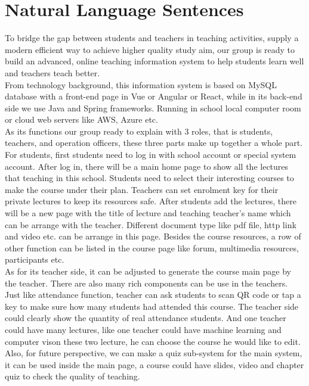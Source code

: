 \section{Natural Language Sentences}

To bridge the gap between students and teachers in teaching activities, supply a modern efficient way to achieve higher quality study aim, our group is ready to build an advanced, online teaching information system to help students learn well and teachers teach better.\\


From technology background, this information system is based on MySQL database with a front-end page in Vue or Angular or React, while in its back-end side we use Java and Spring frameworks. Running in school local computer room or cloud web servers like AWS, Azure etc.\\


As its functions our group ready to explain with 3 roles, that is students, teachers, and operation officers, these three parts make up together a whole part.\\


For students, first students need to log in with school account or special system account. After log in, there will be a main home page to show all the lectures that teaching in this school. Students need to select their interesting courses to make the course under their plan. Teachers can set enrolment key for their private lectures to keep its resources safe. After students add the lectures, there will be a new page with the title of lecture and teaching teacher’s name which can be arrange with the teacher. Different document type like pdf file, http link and video etc. can be arrange in this page. Besides the course resources, a row of other function can be listed in the course page like forum, multimedia resources, participants etc. \\


As for its teacher side, it can be adjusted to generate the course main page by the teacher. There are also many rich components can be use in the teachers. Just like attendance function, teacher can ask students to scan QR code or tap a key to make sure how many students had attended this course. The teacher side could clearly show the quantity of real attendance students. And one teacher could have many lectures, like one teacher could have machine learning and computer vison these two lecture, he can choose the course he would like to edit. Also, for future perspective, we can make a quiz sub-system for the main system, it can be used inside the main page, a course could have slides, video and chapter quiz to check the quality of teaching.\\


